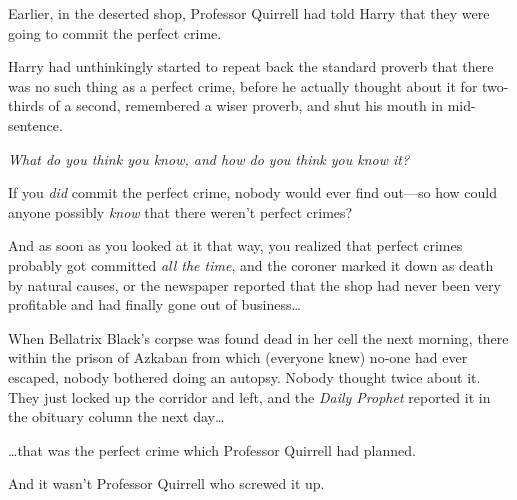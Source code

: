 \later

Earlier, in the deserted shop, Professor Quirrell had told Harry that they were going to commit the perfect crime.

Harry had unthinkingly started to repeat back the standard proverb that there was no such thing as a perfect crime, before he actually thought about it for two-thirds of a second, remembered a wiser proverb, and shut his mouth in mid-sentence.

\emph{What do you think you know, and how do you think you know it?}

If you \emph{did} commit the perfect crime, nobody would ever find out—so how could anyone possibly \emph{know} that there weren't perfect crimes?

And as soon as you looked at it that way, you realized that perfect crimes probably got committed \emph{all the time}, and the coroner marked it down as death by natural causes, or the newspaper reported that the shop had never been very profitable and had finally gone out of business{\ldots}

When Bellatrix Black's corpse was found dead in her cell the next morning, there within the prison of Azkaban from which (everyone knew) no-one had ever escaped, nobody bothered doing an autopsy. Nobody thought twice about it. They just locked up the corridor and left, and the \emph{Daily Prophet} reported it in the obituary column the next day{\ldots}

{\ldots}that was the perfect crime which Professor Quirrell had planned.

And it wasn't Professor Quirrell who screwed it up.

